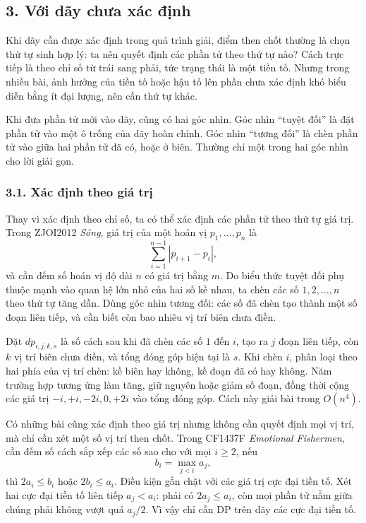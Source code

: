 \documentclass[11pt]{article}
\begin{document}
\subsection*{3. Với dãy chưa xác định}

Khi dãy cần được xác định trong quá trình giải, điểm then chốt thường là chọn
thứ tự sinh hợp lý: ta nên quyết định các phần tử theo thứ tự nào? Cách trực
tiếp là theo chỉ số từ trái sang phải, tức trạng thái là một tiền tố. Nhưng
trong nhiều bài, ảnh hưởng của tiền tố hoặc hậu tố lên phần chưa xác định khó
biểu diễn bằng ít đại lượng, nên cần thứ tự khác.

Khi đưa phần tử mới vào dãy, cũng có hai góc nhìn. Góc nhìn ``tuyệt đối'' là
đặt phần tử vào một ô trống của dãy hoàn chỉnh. Góc nhìn ``tương đối'' là chèn
phần tử vào giữa hai phần tử đã có, hoặc ở biên. Thường chỉ một trong hai góc
nhìn cho lời giải gọn.

\subsubsection*{3.1. Xác định theo giá trị}

Thay vì xác định theo chỉ số, ta có thể xác định các phần tử theo thứ tự giá
trị. Trong ZJOI2012 \emph{Sóng}, giá trị của một hoán vị
\(p_1,\ldots,p_n\) là
\[
  \sum_{i=1}^{n-1}|p_{i+1}-p_i|,
\]
và cần đếm số hoán vị độ dài \(n\) có giá trị bằng \(m\). Do biểu thức tuyệt
đối phụ thuộc mạnh vào quan hệ lớn nhỏ của hai số kề nhau, ta chèn các số
\(1,2,\ldots,n\) theo thứ tự tăng dần. Dùng góc nhìn tương đối: các số đã chèn
tạo thành một số đoạn liên tiếp, và cần biết còn bao nhiêu vị trí biên chưa
điền.

Đặt \(dp_{i,j,k,s}\) là số cách sau khi đã chèn các số \(1\) đến \(i\), tạo ra
\(j\) đoạn liên tiếp, còn \(k\) vị trí biên chưa điền, và tổng đóng góp hiện
tại là \(s\). Khi chèn \(i\), phân loại theo hai phía của vị trí chèn: kề biên
hay không, kề đoạn đã có hay không. Năm trường hợp tương ứng làm tăng, giữ
nguyên hoặc giảm số đoạn, đồng thời cộng các giá trị \(-i, +i, -2i, 0, +2i\)
vào tổng đóng góp. Cách này giải bài trong \(O(n^4)\).

Có những bài cũng xác định theo giá trị nhưng không cần quyết định mọi vị trí,
mà chỉ cần xét một số vị trí then chốt. Trong CF1437F \emph{Emotional
Fishermen}, cần đếm số cách sắp xếp các số sao cho với mọi \(i\ge2\), nếu
\[
  b_i=\max_{j<i}a_j,
\]
thì \(2a_i\le b_i\) hoặc \(2b_i\le a_i\). Điều kiện gắn chặt với các giá trị
cực đại tiền tố. Xét hai cực đại tiền tố liên tiếp \(a_j<a_i\): phải có
\(2a_j\le a_i\), còn mọi phần tử nằm giữa chúng phải không vượt quá \(a_j/2\).
Vì vậy chỉ cần DP trên dãy các cực đại tiền tố.
\end{document}
